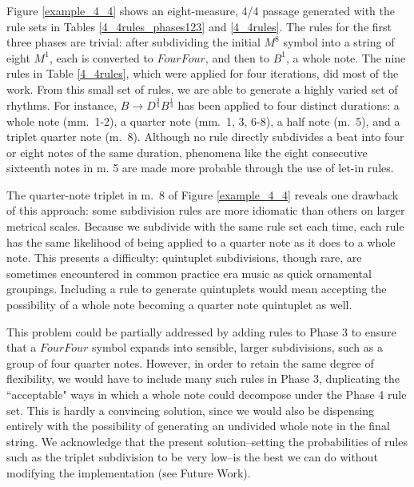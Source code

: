 \documentclass{article}
\begin{document}
Figure \ref{example_4_4} shows an eight-measure, 4/4 passage generated with the rule sets in Tables \ref{4_4rules_phases123} and \ref{4_4rules}. The rules for the first three phases are trivial: after subdividing the initial $M^8$ symbol into a string of eight $M^1$, each is converted to $FourFour$, and then to $B^1$, a whole note. The nine rules in Table \ref{4_4rules}, which were applied for four iterations, did most of the work. From this small set of rules, we are able to generate a highly varied set of rhythms. For instance, $B \rightarrow D^\frac{3}{4} B^\frac{1}{4}$ has been applied to four distinct durations: a whole note (mm.\ 1-2), a quarter note (mm.\ 1, 3, 6-8), a half note (m.\ 5), and a triplet quarter note (m.\ 8). Although no rule directly subdivides a beat into four or eight notes of the same duration, phenomena like the eight consecutive sixteenth notes in m. 5 are made more probable through the use of let-in rules.

The quarter-note triplet in m.\ 8 of Figure \ref{example_4_4} reveals one drawback of this approach: some subdivision rules are \linebreak more idiomatic than others on larger metrical scales. Because we subdivide with the same rule set each time, each rule has the same likelihood of being applied to a quarter note as it does to a whole note. This presents a difficulty: quintuplet subdivisions, though rare, are sometimes encountered in common practice era music as quick ornamental groupings. Including a rule to generate quintuplets would mean accepting the possibility of a whole note becoming a quarter note quintuplet as well.

This problem could be partially addressed by adding rules to Phase 3 to ensure that a $FourFour$ symbol expands into sensible, larger subdivisions, such as a group of four quarter notes. However, in order to retain the same degree of flexibility, we would have to include many such rules in Phase 3, duplicating the ``acceptable" ways in which a whole note could decompose under the Phase 4 rule set. This is hardly a convincing solution, since we would also be dispensing entirely with the possibility of generating an undivided whole note in the final string. We acknowledge that the present solution--setting the probabilities of rules such as the triplet subdivision to be very low--is the best we can do without modifying the implementation (see Future Work).
\end{document}
